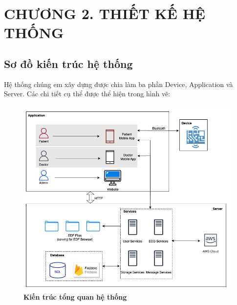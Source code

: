 
\section*{CHƯƠNG 2. THIẾT KẾ HỆ THỐNG}
\setcounter{section}{2}
\setcounter{subsection}{0} %
\setcounter{table}{0} %
\setcounter{figure}{0} %


\subsection{Sơ đồ kiến trúc hệ thống}
Hệ thống chúng em xây dựng được chia làm ba phần Device, Application và Server. Các chi tiết cụ thể được thể hiện trong
hình vẽ:

\begin{figure}[H]
  \centering
  \includegraphics[width=12cm,height=10cm]{Images/system/fmECG_architecture-System_Architecture.png}
  \caption[Kiến trúc tổng quan hệ thống]{\bfseries \fontsize{12pt}{0pt}\selectfont Kiến trúc tổng quan hệ thống}
  \label{fmECG_architecture-System} %
\end{figure}


